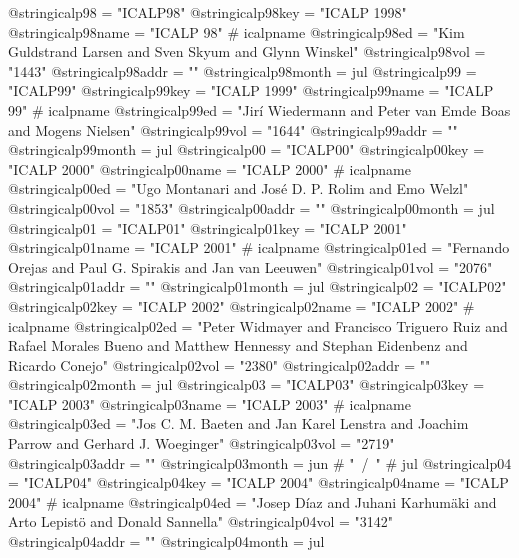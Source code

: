 @string{icalp98 =               "ICALP98"}
@string{icalp98key =            "ICALP 1998"}
@string{icalp98name =           "ICALP 98" # icalpname}
@string{icalp98ed =             "Kim Guldstrand Larsen and Sven Skyum and Glynn Winskel"}
@string{icalp98vol =            "1443"}
@string{icalp98addr =           ""}
@string{icalp98month =          jul}
@string{icalp99 =               "ICALP99"}
@string{icalp99key =            "ICALP 1999"}
@string{icalp99name =           "ICALP 99" # icalpname}
@string{icalp99ed =             "Jir{\'i} Wiedermann and Peter {van Emde Boas} and Mogens Nielsen"}
@string{icalp99vol =            "1644"}
@string{icalp99addr =           ""}
@string{icalp99month =          jul}
@string{icalp00 =               "ICALP00"}
@string{icalp00key =            "ICALP 2000"}
@string{icalp00name =           "ICALP 2000" # icalpname}
@string{icalp00ed =             "Ugo Montanari and Jos{\'e} D. P. Rolim and Emo Welzl"}
@string{icalp00vol =            "1853"}
@string{icalp00addr =           ""}
@string{icalp00month =          jul}
@string{icalp01 =               "ICALP01"}
@string{icalp01key =            "ICALP 2001"}
@string{icalp01name =           "ICALP 2001" # icalpname}
@string{icalp01ed =             "Fernando Orejas and Paul G. Spirakis and Jan {van Leeuwen}"}
@string{icalp01vol =            "2076"}
@string{icalp01addr =           ""}
@string{icalp01month =          jul}
@string{icalp02 =               "ICALP02"}
@string{icalp02key =            "ICALP 2002"}
@string{icalp02name =           "ICALP 2002" # icalpname}
@string{icalp02ed =             "Peter Widmayer and Francisco Triguero Ruiz and Rafael Morales Bueno and Matthew Hennessy and Stephan Eidenbenz and Ricardo Conejo"}
@string{icalp02vol =            "2380"}
@string{icalp02addr =           ""}
@string{icalp02month =          jul}
@string{icalp03 =               "ICALP03"}
@string{icalp03key =            "ICALP 2003"}
@string{icalp03name =           "ICALP 2003" # icalpname}
@string{icalp03ed =             "Jos C. M. Baeten and Jan Karel Lenstra and Joachim Parrow and Gerhard J. Woeginger"}
@string{icalp03vol =            "2719"}
@string{icalp03addr =           ""}
@string{icalp03month =          jun # "~/~" # jul}
@string{icalp04 =               "ICALP04"}
@string{icalp04key =            "ICALP 2004"}
@string{icalp04name =           "ICALP 2004" # icalpname}
@string{icalp04ed =             "Josep D{\'i}az and Juhani Karhum{\"a}ki and Arto Lepist{\"o} and Donald Sannella"}
@string{icalp04vol =            "3142"}
@string{icalp04addr =           ""}
@string{icalp04month =          jul}
